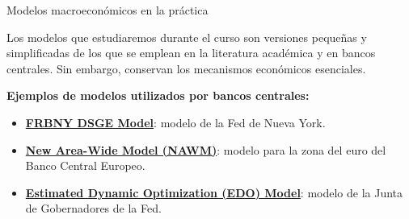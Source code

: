 \documentclass[aspectratio=169,11pt]{beamer}
\begin{document}
\begin{frame}{Modelos macroeconómicos en la práctica}

  Los modelos que estudiaremos durante el curso son versiones pequeñas y
  simplificadas de los que se emplean en la literatura académica y en
  bancos centrales. Sin embargo, conservan los mecanismos económicos
  esenciales.

  \vspace{0.3cm}

  \textbf{Ejemplos de modelos utilizados por bancos centrales:}

  \begin{itemize}
    \setlength{\itemsep}{0.45em}

    \item \href{https://www.newyorkfed.org/research/policy/dsge}
    {\textbf{FRBNY DSGE Model}}:
    modelo de la Fed de Nueva York.

    \item \href{https://www.ecb.europa.eu/pub/pdf/scpwps/ecbwp944.pdf}
    {\textbf{New Area-Wide Model (NAWM)}}:
    modelo para la zona del euro del Banco Central Europeo.

    \item \href{https://www.federalreserve.gov/econres/edo-models-about.htm}
    {\textbf{Estimated Dynamic Optimization (EDO) Model}}:
    modelo de la Junta de Gobernadores de la Fed.
  \end{itemize}

\end{frame}
\end{document}
